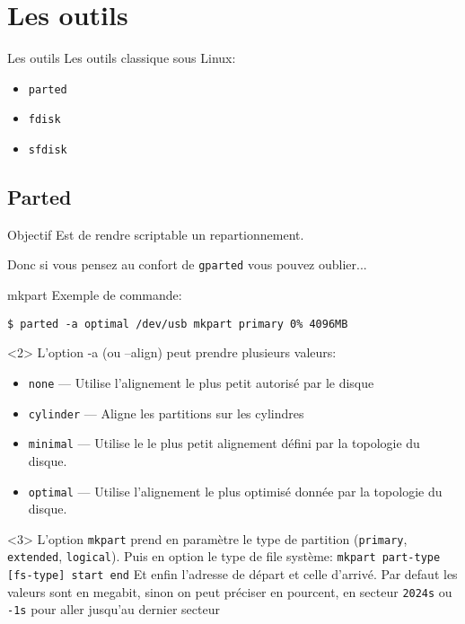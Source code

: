 \documentclass[compress]{beamer}
\begin{document}
\section{Les outils}

\begin{frame}[fragile]{Les outils}
Les outils classique sous Linux:
\begin{itemize}
	\item \texttt{parted}
	\item \texttt{fdisk}
	\item \texttt{sfdisk}
\end{itemize}
\end{frame}

\subsection{Parted}

\begin{frame}[fragile]
\begin{block}{Objectif}
Est de rendre scriptable un repartionnement.
\end{block}
Donc si vous pensez au confort de \texttt{gparted} vous pouvez oublier...
\end{frame}

\begin{frame}[fragile]{mkpart}
Exemple de commande:
\begin{lstlisting}[style=shell]
$ parted -a optimal /dev/usb mkpart primary 0% 4096MB
\end{lstlisting}
\begin{onlyenv}<2>
L'option -a (ou --align) peut prendre plusieurs valeurs:
\begin{itemize}
\item \texttt{none} — Utilise l'alignement le plus petit autorisé par le disque
\item \texttt{cylinder} — Aligne les partitions sur les cylindres
\item \texttt{minimal} — Utilise le le plus petit alignement défini par la topologie du disque.
\item \texttt{optimal} — Utilise l'alignement le plus optimisé donnée par la topologie du disque.
\end{itemize}
\end{onlyenv}
\begin{onlyenv}<3>
L'option \texttt{mkpart} prend en paramètre le type de partition (\texttt{primary}, \texttt{extended}, \texttt{logical}).\newline
Puis en option le type de file système:\newline
\texttt{mkpart part-type [fs-type] start end}\newline
Et enfin l'adresse de départ et celle d'arrivé.\newline
\newline
Par defaut les valeurs sont en megabit, sinon on peut préciser en pourcent, en secteur \texttt{2024s} ou \texttt{-1s} pour aller jusqu'au dernier secteur
\end{onlyenv}
\end{frame}
\end{document}
